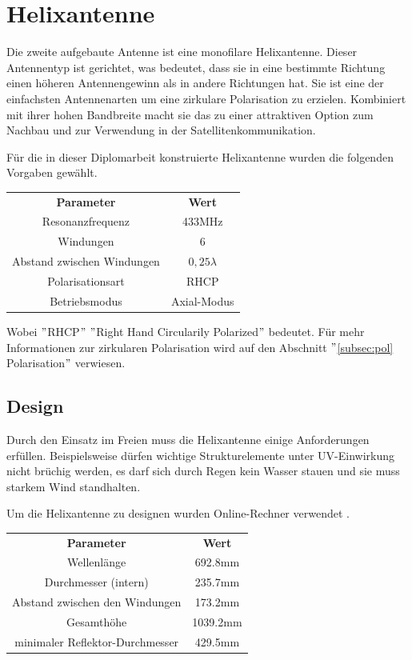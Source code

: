 \chapter{Helixantenne}
Die zweite aufgebaute Antenne ist eine monofilare Helixantenne. Dieser Antennentyp ist gerichtet, was bedeutet, dass sie in eine bestimmte Richtung einen höheren Antennengewinn als in andere Richtungen hat. Sie ist eine der einfachsten Antennenarten um eine zirkulare Polarisation zu erzielen. Kombiniert mit ihrer hohen Bandbreite macht sie das zu einer attraktiven Option zum Nachbau und zur Verwendung in der Satellitenkommunikation. \cite{helixWebsite}

Für die in dieser Diplomarbeit konstruierte Helixantenne wurden die folgenden Vorgaben gewählt.

\begin{center}
	\begin{tabular}{|c|c|}
	\textbf{Parameter} & \textbf{Wert}\\
	Resonanzfrequenz & 433MHz\\
	Windungen & 6\\
	Abstand zwischen Windungen & $0,25\lambda$\\
	Polarisationsart & RHCP\\
	Betriebsmodus & Axial-Modus
\end{tabular}
\end{center}

Wobei $"$RHCP$"$ $"$Right Hand Circularily Polarized$"$ bedeutet. Für mehr Informationen zur zirkularen Polarisation wird auf den Abschnitt $"$\ref{subsec:pol} Polarisation$"$ verwiesen.

\section{Design}
Durch den Einsatz im Freien muss die Helixantenne einige Anforderungen erfüllen. Beispielsweise dürfen wichtige Strukturelemente unter UV-Einwirkung nicht brüchig werden, es darf sich durch Regen kein Wasser stauen und sie muss starkem Wind standhalten. 

Um die Helixantenne zu designen wurden Online-Rechner verwendet \cite{calculator_daycounter, calculator_jcoppens}.

\begin{center}
	\begin{tabular}{|c|c|}
	\textbf{Parameter} & \textbf{Wert} \\
	Wellenlänge &  692.8mm\\
	Durchmesser (intern) & 235.7mm\\
	Abstand zwischen den Windungen & 173.2mm\\
	Gesamthöhe & 1039.2mm\\
	minimaler Reflektor-Durchmesser & 429.5mm
\end{tabular}
\end{center}

